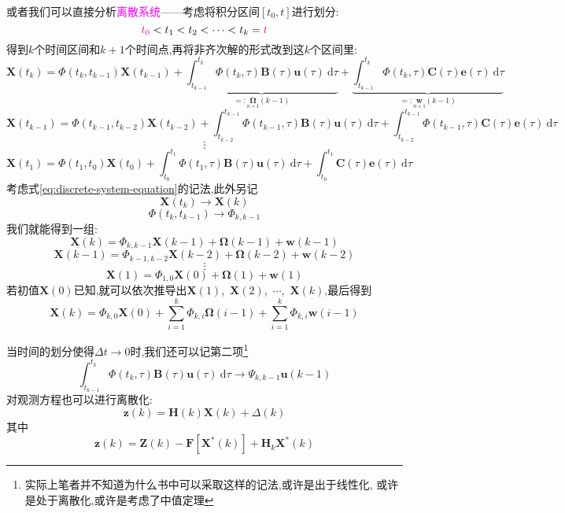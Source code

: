 \documentclass[cn,10pt,citestyle=gb7714-2015,bibstyle=gb7714-2015]{elegantbook}
\newcommand{\md}{\ \mathrm{d}}
\begin{document}
或者我们可以直接分析\textcolor{magenta}{离散系统}——考虑将积分区间$[t_0,t]$进行划分:
\[
    \textcolor{magenta}{t_0}<t_1<t_2<\cdots<t_k=\textcolor{magenta}{t}
\]
得到$k$个时间区间和$k+1$个时间点,再将非齐次解的形式改到这$k$个区间里:
\begin{equation}\label{eq:discrete-system-equation}
  \bm{X}(t_k)=\bm{\varPhi}(t_k,t_{k-1})\bm{X}(t_{k-1})+\underbrace{\int_{t_{k-1}}^{t_k}\bm{\varPhi}(t_k,\tau)\bm{B}(\tau)\bm{u}(\tau)\md\tau}_{=:\underset{n\times 1}{\bm{\Omega}}(k-1)}+\underbrace{\int_{t_{k-1}}^{t_k}\bm{\varPhi}(t_k,\tau)\bm{C}(\tau)\bm{e}(\tau)\md\tau}_{=:\underset{n\times 1}{\bm{w}}(k-1)}
\end{equation}
\[
  \bm{X}(t_{k-1})=\bm{\varPhi}(t_{k-1},t_{k-2})\bm{X}(t_{k-2})+\int_{t_{k-2}}^{t_{k-1}}\bm{\varPhi}(t_{k-1},\tau)\bm{B}(\tau)\bm{u}(\tau)\md\tau+\int_{t_{k-2}}^{t_{k-1}}\bm{\varPhi}(t_{k-1},\tau)\bm{C}(\tau)\bm{e}(\tau)\md\tau
\]
\[
    \vdots
\]
\[
  \bm{X}(t_1)=\bm{\varPhi}(t_1,t_0)\bm{X}(t_0)+\int_{t_0}^{t_1}\bm{\varPhi}(t_1,\tau)\bm{B}(\tau)\bm{u}(\tau)\md\tau+\int_{t_0}^{t_1}\bm{C}(\tau)\bm{e}(\tau)\md\tau
\]
考虑式\eqref{eq:discrete-system-equation}的记法,此外另记
\[
    \bm{X}(t_k)\longrightarrow\bm{X}(k)
\]
\[
    \bm{\varPhi}(t_k,t_{k-1})\longrightarrow\bm{\varPhi}_{k,k-1}
\]
我们就能得到一组:
\begin{equation}\label{eq:discrete-system-equation-easy}
  \boxed{\bm{X}(k)=\bm{\varPhi}_{k,k-1}\bm{X}(k-1)+\bm{\Omega}(k-1)+\bm{w}(k-1)}
\end{equation}
\[
  \bm{X}(k-1)=\bm{\varPhi}_{k-1,k-2}\bm{X}(k-2)+\bm{\Omega}(k-2)+\bm{w}(k-2)
\]
\[
    \vdots
\]
\[
  \bm{X}(1)=\bm{\varPhi}_{1,0}\bm{X}(0)+\bm{\Omega}(1)+\bm{w}(1)
\]
若初值$\bm{X}(0)$已知,就可以依次推导出$\bm{X}(1)$,\ $\bm{X}(2)$,\ $\cdots$,\ $\bm{X}(k)$,最后得到
\begin{equation}
  \bm{X}(k)=\bm{\varPhi}_{k,0}\bm{X}(0)+\sum_{i=1}^k\bm{\varPhi}_{k,i}\bm{\Omega}(i-1)+\sum_{i=1}^k\bm{\varPhi}_{k,i}\bm{w}(i-1)
\end{equation}

当时间的划分使得$\Delta t\to 0$时,我们还可以记第二项\footnote{实际上笔者并不知道为什么书中可以采取这样的记法,或许是出于线性化,
或许是处于离散化,或许是考虑了中值定理}
\[
  \int_{t_{k-1}}^{t_k}\bm{\varPhi}(t_k,\tau)\bm{B}(\tau)\bm{u}(\tau)\md\tau\longrightarrow\bm{\varPsi}_{k,k-1}\bm{u}(k-1)
\]
对观测方程也可以进行离散化:
\begin{equation}
  \bm{z}(k)=\bm{H}(k)\bm{X}(k)+\bm{\varDelta}(k)
\end{equation}
其中
\begin{equation}
  \bm{z}(k)=\bm{Z}(k)-\bm{F}[\bm{X}^*(k)]+\bm{H}_k\bm{X}^*(k)
\end{equation}
\end{document}

